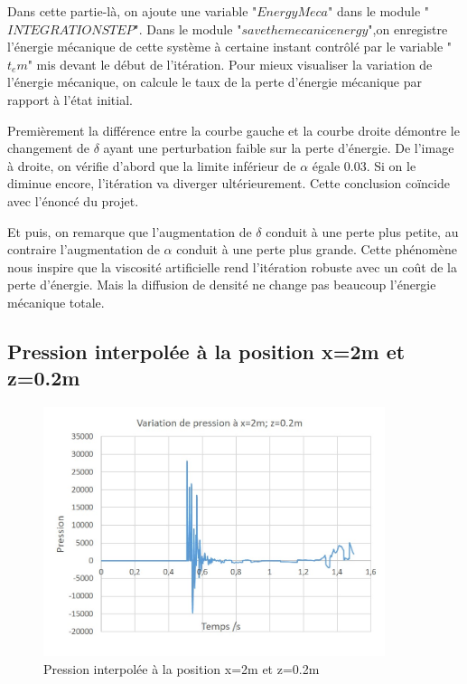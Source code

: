 \documentclass{article}
\begin{document}
Dans cette partie-là, on ajoute une variable "$EnergyMeca$" dans le module "$INTEGRATION STEP$". Dans le module "$save the mecanic energy$",on enregistre l'énergie mécanique de cette système à certaine instant contrôlé par le variable "$t_em$" mis devant le début de l'itération. Pour mieux visualiser la variation de l'énergie mécanique, on calcule le taux de la perte d'énergie mécanique par rapport à l'état initial.

Premièrement la différence entre la courbe gauche et la courbe droite démontre le changement de $\delta$ ayant une perturbation faible sur la perte d'énergie. De l'image à droite, on vérifie d'abord que la limite inférieur de $\alpha$ égale $0.03$. Si on le diminue encore, l'itération va diverger ultérieurement. Cette conclusion coïncide avec l'énoncé du projet.

Et puis, on remarque que l'augmentation de $\delta$ conduit à une perte plus petite, au contraire l'augmentation de $\alpha$ conduit à une perte plus grande. Cette phénomène nous inspire que la viscosité artificielle rend l'itération robuste avec un coût de la perte d'énergie. Mais la diffusion de densité ne change pas beaucoup l'énergie mécanique totale. 
          
\subsection{Pression interpolée à la position x=2m et z=0.2m}
\begin{figure}[H]
	\begin{center}
		\includegraphics[width=10cm]{img/VariationPression.jpg}
	\end{center}
	\caption{Pression interpolée à la position x=2m et z=0.2m}
\end{figure}
\end{document}
